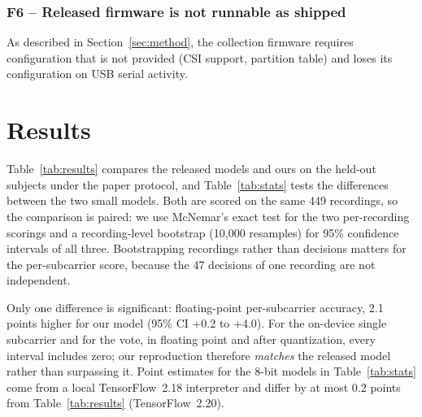 \documentclass[journal]{IEEEtran}
\begin{document}
\subsubsection*{F6 -- Released firmware is not runnable as shipped}
As described in Section~\ref{sec:method}, the collection firmware requires
configuration that is not provided (CSI support, partition table) and loses its
configuration on USB serial activity.

\section{Results}
\label{sec:results}

Table~\ref{tab:results} compares the released models and ours on the held-out
subjects under the paper protocol, and Table~\ref{tab:stats} tests the differences
between the two small models. Both are scored on the same 449 recordings, so the
comparison is paired: we use McNemar's exact test for the two per-recording scorings
and a recording-level bootstrap (10{,}000 resamples) for 95\% confidence intervals of
all three. Bootstrapping recordings rather than decisions matters for the
per-subcarrier score, because the 47 decisions of one recording are not independent.

Only one difference is significant: floating-point per-subcarrier accuracy, 2.1
points higher for our model (95\% CI +0.2 to +4.0). For the on-device single
subcarrier and for the vote, in floating point and after quantization, every
interval includes zero; our reproduction therefore \emph{matches} the released
model rather than surpassing it. Point estimates for the 8-bit models in
Table~\ref{tab:stats} come from a local TensorFlow~2.18 interpreter and differ by at
most 0.2 points from Table~\ref{tab:results} (TensorFlow~2.20).
\end{document}
